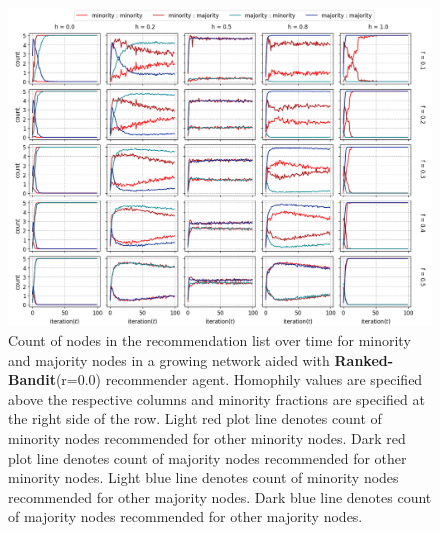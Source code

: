 \begin{appendices}
\begin{figure}[h!]
	\centering
	\includegraphics[width=1.0\textwidth]{images/count_rb00.png}
	\caption{Count of nodes in the recommendation list over time for minority and majority nodes in a growing network aided with \textbf{Ranked-Bandit}(r=0.0) recommender agent. Homophily values are specified above the respective columns and minority fractions are specified at the right side of the row. Light red plot line denotes count of minority nodes recommended for other minority nodes. Dark red plot line denotes count of majority nodes recommended for other minority nodes. Light blue line denotes count of minority nodes recommended for other majority nodes. Dark blue line denotes count of majority nodes recommended for other majority nodes.}
	\label{count_rb00}
\end{figure}


\end{appendices}

